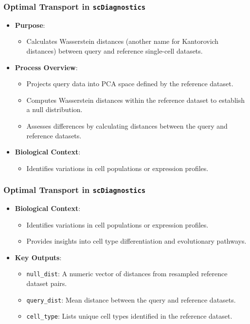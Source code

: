 \documentclass{beamer}
\begin{document}
	\begin{frame}
		\frametitle{Optimal Transport in \texttt{scDiagnostics}}
		\begin{itemize}
			\item \textbf{Purpose}:
			\begin{itemize}
				\item Calculates Wasserstein distances (another name for Kantorovich distances) between query and reference single-cell datasets.
			\end{itemize}
			
			\item \textbf{Process Overview}:
			\begin{itemize}
				\item Projects query data into PCA space defined by the reference dataset.
				\item Computes Wasserstein distances within the reference dataset to establish a null distribution.
				\item Assesses differences by calculating distances between the query and reference datasets.
			\end{itemize}
			\item \textbf{Biological Context}:
			\begin{itemize}
				\item Identifies variations in cell populations or expression profiles.
			\end{itemize}
		\end{itemize}
	\end{frame}
	
	\begin{frame}
		\frametitle{Optimal Transport in \texttt{scDiagnostics}}
		\begin{itemize}
			\item \textbf{Biological Context}:
				\begin{itemize}
					\item Identifies variations in cell populations or expression profiles.
					\item Provides insights into cell type differentiation and evolutionary pathways.
				\end{itemize}
				
				\item \textbf{Key Outputs}:
					\begin{itemize}
						\item \texttt{null\_dist}: A numeric vector of distances from resampled reference dataset pairs.
						\item \texttt{query\_dist}: Mean distance between the query and reference datasets.
						\item \texttt{cell\_type}: Lists unique cell types identified in the reference dataset.
					\end{itemize}
				\end{itemize}
			\end{frame}
			
\end{document}
